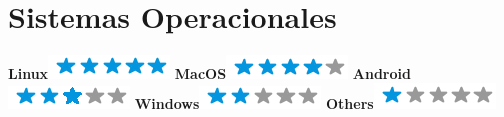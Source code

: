 \begin{aside}
    ~
    ~
    ~
    ~
    ~
    ~
    ~
    ~
    ~
    ~
    ~
    ~
    ~
    ~
    ~
    ~
    ~
    ~
    ~
    ~
    ~
    ~
    ~
    ~
    ~
    ~
    ~
    ~
    \section{Sistemas Operacionales}
    \textbf{Linux}\includegraphics[scale=0.40]{img/5stars.png}
    \textbf{MacOS}\includegraphics[scale=0.40]{img/4stars.png}
    \textbf{Android}\includegraphics[scale=0.40]{img/3stars.png}
    \textbf{Windows}\includegraphics[scale=0.40]{img/2stars.png}
    \textbf{Others}\includegraphics[scale=0.40]{img/1stars.png}
\end{aside}
